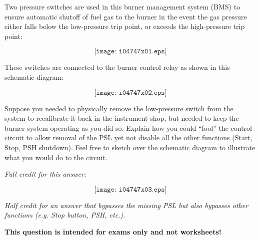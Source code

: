 

Two pressure switches are used in this burner management system (BMS) to ensure automatic shutoff of fuel gas to the burner in the event the gas pressure either falls below the low-pressure trip point, or exceeds the high-pressure trip point:

$$\texttt{[image: i04747x01.eps]}$$

These switches are connected to the burner control relay as shown in this schematic diagram:

$$\texttt{[image: i04747x02.eps]}$$

Suppose you needed to physically remove the low-pressure switch from the system to recalibrate it back in the instrument shop, but needed to keep the burner system operating as you did so.  Explain how you could ``fool'' the control circuit to allow removal of the PSL yet not disable all the other functions (Start, Stop, PSH shutdown).  Feel free to sketch over the schematic diagram to illustrate what you would do to the circuit.







{\it Full credit for this answer:}

$$\texttt{[image: i04747x03.eps]}$$

{\it Half credit for an answer that bypasses the missing PSL but also bypasses other functions (e.g. Stop button, PSH, etc.).}







{\bf This question is intended for exams only and not worksheets!}



